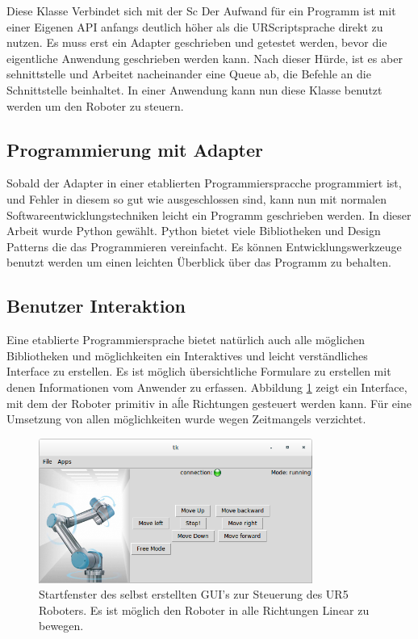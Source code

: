  Diese Klasse Verbindet sich mit der Sc
Der Aufwand für ein Programm ist mit einer Eigenen API anfangs deutlich höher als die URScriptsprache direkt zu nutzen. Es muss erst ein Adapter geschrieben und getestet werden, bevor die eigentliche Anwendung geschrieben werden kann. 
Nach dieser Hürde, ist es aber sehnittstelle und Arbeitet nacheinander eine Queue ab, die Befehle an die Schnittstelle beinhaltet.
In einer Anwendung kann nun diese Klasse benutzt werden um den Roboter zu steuern.

\subsection{Programmierung mit Adapter}
\label{programmierung_mit_hoerherer_schicht}

Sobald der Adapter in einer etablierten Programmierspracche programmiert ist, und Fehler in diesem so gut wie ausgeschlossen sind, kann nun mit normalen Softwareentwicklungstechniken leicht ein Programm geschrieben werden. In dieser Arbeit wurde Python gewählt. Python bietet viele Bibliotheken und Design Patterns die das Programmieren vereinfacht. Es können Entwicklungswerkzeuge benutzt werden um einen leichten Überblick über das Programm zu behalten.

\subsection{Benutzer Interaktion}
\label{user_interaktion_mit_hoerherer_schicht}

Eine etablierte Programmiersprache bietet natürlich auch alle möglichen Bibliotheken und möglichkeiten ein Interaktives und leicht verständliches Interface zu erstellen. Es ist möglich übersichtliche Formulare zu erstellen mit denen Informationen vom Anwender zu erfassen. Abbildung \ref{fig:hda_urcontrol_gui} zeigt ein Interface, mit dem der Roboter primitiv in aĺle Richtungen gesteuert werden kann. Für eine Umsetzung von allen möglichkeiten wurde wegen Zeitmangels verzichtet.

\begin{figure}[ht]
  \centering
    \includegraphics[width=0.8\textwidth]{pic/hda_urcontrol_gui.png}
      \caption[Selbsterstelltes GUI zur Steuerung des UR5 Roboters]{Startfenster des selbst erstellten GUI's zur Steuerung des UR5 Roboters. Es ist möglich den Roboter in alle Richtungen Linear zu bewegen.}
      \label{fig:hda_urcontrol_gui}
\end{figure}

